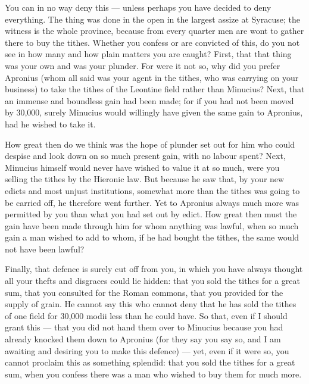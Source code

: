  You can in no way deny this --- unless perhaps you have decided to deny everything. The thing was done in the open in the largest assize at Syracuse; the witness is the whole province, because from every quarter men are wont to gather there to buy the tithes. Whether you confess or are convicted of this, do you not see in how many and how plain matters you are caught? First, that that thing was your own and was your plunder. For were it not so, why did you prefer Apronius (whom all said was your agent in the tithes, who was carrying on your business) to take the tithes of the Leontine field rather than Minucius? Next, that an immense and boundless gain had been made; for if you had not been moved by 30,000, surely Minucius would willingly have given the same gain to Apronius, had he wished to take it.

 How great then do we think was the hope of plunder set out for him who could despise and look down on so much present gain, with no labour spent? Next, Minucius himself would never have wished to value it at so much, were you selling the tithes by the Hieronic law. But because he saw that, by your new edicts and most unjust institutions, somewhat more than the tithes was going to be carried off, he therefore went further. Yet to Apronius always much more was permitted by you than what you had set out by edict. How great then must the gain have been made through him for whom anything was lawful, when so much gain a man wished to add to whom, if he had bought the tithes, the same would not have been lawful?

 Finally, that defence is surely cut off from you, in which you have always thought all your thefts and disgraces could lie hidden: that you sold the tithes for a great sum, that you consulted for the Roman commons, that you provided for the supply of grain. He cannot say this who cannot deny that he has sold the tithes of one field for 30,000 modii less than he could have. So that, even if I should grant this --- that you did not hand them over to Minucius because you had already knocked them down to Apronius (for they say you say so, and I am awaiting and desiring you to make this defence) --- yet, even if it were so, you cannot proclaim this as something splendid: that you sold the tithes for a great sum, when you confess there was a man who wished to buy them for much more.

